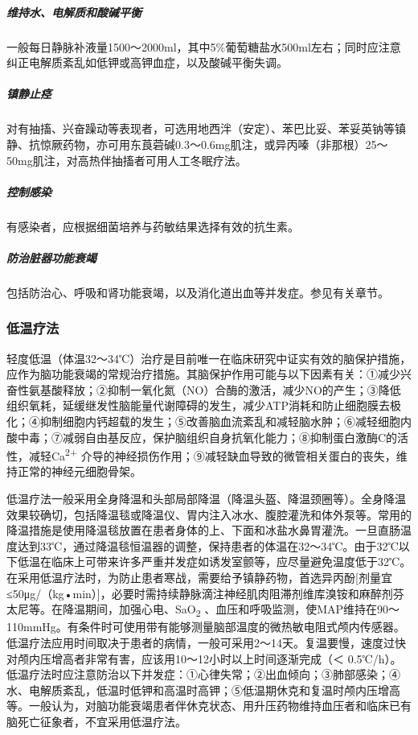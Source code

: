 \subparagraph{维持水、电解质和酸碱平衡}

一般每日静脉补液量1500～2000ml，其中5\%葡萄糖盐水500ml左右；同时应注意纠正电解质紊乱如低钾或高钾血症，以及酸碱平衡失调。

\subparagraph{镇静止痉}

对有抽搐、兴奋躁动等表现者，可选用地西泮（安定）、苯巴比妥、苯妥英钠等镇静、抗惊厥药物，亦可用东莨菪碱0.3～0.6mg肌注，或异丙嗪（非那根）25～50mg肌注，对高热伴抽搐者可用人工冬眠疗法。

\subparagraph{控制感染}

有感染者，应根据细菌培养与药敏结果选择有效的抗生素。

\subparagraph{防治脏器功能衰竭}

包括防治心、呼吸和肾功能衰竭，以及消化道出血等并发症。参见有关章节。

\subsubsection{低温疗法}

轻度低温（体温32～34℃）治疗是目前唯一在临床研究中证实有效的脑保护措施，应作为脑功能衰竭的常规治疗措施。其脑保护作用可能与以下因素有关：①减少兴奋性氨基酸释放；②抑制一氧化氮（NO）合酶的激活，减少NO的产生；③降低组织氧耗，延缓继发性脑能量代谢障碍的发生，减少ATP消耗和防止细胞膜去极化；④抑制细胞内钙超载的发生；⑤改善脑血流紊乱和减轻脑水肿；⑥减轻细胞内酸中毒；⑦减弱自由基反应，保护脑组织自身抗氧化能力；⑧抑制蛋白激酶C的活性，减轻Ca\textsuperscript{2+}
介导的神经损伤作用；⑨减轻缺血导致的微管相关蛋白的丧失，维持正常的神经元细胞骨架。

低温疗法一般采用全身降温和头部局部降温（降温头盔、降温颈圈等）。全身降温效果较确切，包括降温毯或降温仪、胃内注入冰水、腹腔灌洗和体外泵等。常用的降温措施是使用降温毯放置在患者身体的上、下面和冰盐水鼻胃灌洗。一旦直肠温度达到33℃，通过降温毯恒温器的调整，保持患者的体温在32～34℃。由于32℃以下低温在临床上可带来许多严重并发症如诱发室颤等，应尽量避免温度低于32℃。在采用低温疗法时，为防止患者寒战，需要给予镇静药物，首选异丙酚{[}剂量宜≤50μg/（kg•min）{]}，必要时需持续静脉滴注神经肌肉阻滞剂维库溴铵和麻醉剂芬太尼等。在降温期间，加强心电、SaO\textsubscript{2}
、血压和呼吸监测，使MAP维持在90～110mmHg。有条件时可使用带有能够测量脑部温度的微热敏电阻式颅内传感器。低温疗法应用时间取决于患者的病情，一般可采用2～14天。复温要慢，速度过快对颅内压增高者非常有害，应该用10～12小时以上时间逐渐完成（＜
0.5℃/h）。低温疗法时应注意防治以下并发症：①心律失常；②出血倾向；③肺部感染；④水、电解质紊乱，低温时低钾和高温时高钾；⑤低温期休克和复温时颅内压增高等。一般认为，对脑功能衰竭患者伴休克状态、用升压药物维持血压者和临床已有脑死亡征象者，不宜采用低温疗法。

